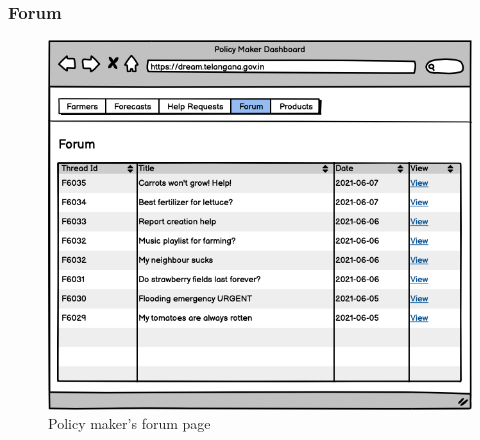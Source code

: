 \documentclass[10pt]{article} %
\begin{document}
\subsubsection{Forum}
\begin{figure}[h!]
    \centering
    \centerline{\includegraphics[scale=0.54]{images/uimockups/pm_forum.png}}
    \caption{Policy maker's forum page}
    \label{fig:ui_pm_forum}
\end{figure}
\newpage
\end{document}
